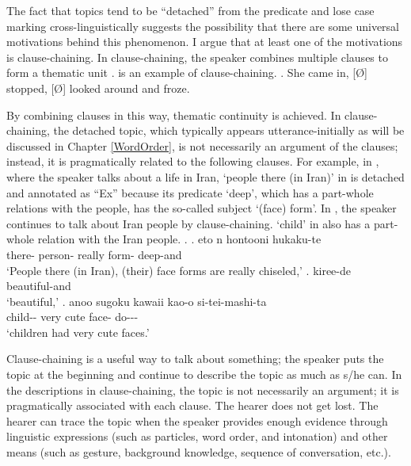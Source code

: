 The fact that topics tend to be ``detached'' from the predicate and
lose case marking cross-linguistically suggests the possibility that
there are some universal motivations behind this phenomenon.
I argue that at least one of the motivations is clause-chaining.
In clause-chaining,
the speaker combines multiple clauses to form a thematic unit
\cite{longacre85,martin92,givon01}.
\Next is an example of clause-chaining.
%
\ex. She came in, [\O] stopped, [\O] looked around and froze.\\
     \hfill{\cite[349]{givon01}}

By combining clauses in this way,
thematic continuity is achieved.
In clause-chaining,
the detached topic, which typically appears utterance-initially as will be discussed in Chapter \ref{WordOrder},
is not necessarily an argument of the clauses;
instead, it is pragmatically related to the following clauses.
For example, in \Next,
where the speaker talks about a life in Iran,
 `people there (in Iran)' in \Next[a] is detached
and annotated as ``Ex''
because its predicate  `deep', which has a part-whole relations with the people, has the so-called subject  `(face) form'.
In \Next[b-c], the speaker continues to talk about Iran people
by clause-chaining.
 `child' in \Next[c] also has a part-whole relation
with the Iran people.
%
\ex.
 \ag. eto n   hontooni  hukaku-te \\
        there- person- really form- deep-and \\
      `People there (in Iran), (their) face forms are really chiseled,'
 \bg. kiree-de \\
      beautiful-and \\
      `beautiful,'
 \bg.  anoo sugoku kawaii kao-o si-tei-mashi-ta \\
      child--  very cute face- do--- \\
      `children had very cute faces.'

Clause-chaining is a useful way to talk about something;
the speaker puts the topic at the beginning and
continue to describe the topic as much as s/he can.
In the descriptions in clause-chaining,
the topic is not necessarily an argument;
it is pragmatically associated with each clause.
The hearer does not get lost.
The hearer can trace the topic
when the speaker provides enough evidence
through linguistic expressions (such as particles, word order, and intonation) and other means (such as gesture, background knowledge, sequence of conversation, etc.).

